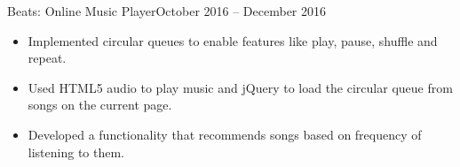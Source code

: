 \begin{cvsubsection}{Beats: \href{ https://github.com/a3y3/Beats}{}}{Online Music Player}{October 2016 -- December 2016}
	\begin{itemize}
        \item Implemented circular queues to enable features like play, pause, shuffle and repeat.
        \item Used HTML5 audio to play music and jQuery to load the circular queue from songs on the current page.
        \item Developed a functionality that recommends songs based on frequency of listening to them.
	\end{itemize}
\end{cvsubsection}